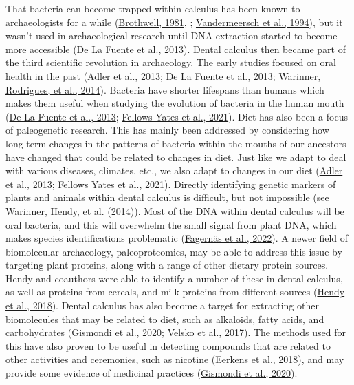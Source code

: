 \documentclass[
  b5paper,
]{book}
\begin{document}
That bacteria can become trapped within calculus has been known to
archaeologists for a while
(\protect\hyperlink{ref-brothwellDiggingBones1981}{Brothwell, 1981}, ;
\protect\hyperlink{ref-vandermeerschMiddlePaleolithic1994}{Vandermeersch
et al., 1994}), but it wasn't used in archaeological research until DNA
extraction started to become more accessible
(\protect\hyperlink{ref-delafuenteDNAHuman2013}{De La Fuente et al.,
2013}). Dental calculus then became part of the third scientific
revolution in archaeology. The early studies focused on oral health in
the past (\protect\hyperlink{ref-adlerSequencingAncient2013}{Adler et
al., 2013}; \protect\hyperlink{ref-delafuenteDNAHuman2013}{De La Fuente
et al., 2013};
\protect\hyperlink{ref-warinnerPathogensHost2014}{Warinner, Rodrigues,
et al., 2014}). Bacteria have shorter lifespans than humans which makes
them useful when studying the evolution of bacteria in the human mouth
(\protect\hyperlink{ref-delafuenteDNAHuman2013}{De La Fuente et al.,
2013}; \protect\hyperlink{ref-yatesOralMicrobiome2021}{Fellows Yates et
al., 2021}). Diet has also been a focus of paleogenetic research. This
has mainly been addressed by considering how long-term changes in the
patterns of bacteria within the mouths of our ancestors have changed
that could be related to changes in diet. Just like we adapt to deal
with various diseases, climates, etc., we also adapt to changes in our
diet (\protect\hyperlink{ref-adlerSequencingAncient2013}{Adler et al.,
2013}; \protect\hyperlink{ref-yatesOralMicrobiome2021}{Fellows Yates et
al., 2021}). Directly identifying genetic markers of plants and animals
within dental calculus is difficult, but not impossible (see Warinner,
Hendy, et al. (\protect\hyperlink{ref-warinnerEvidenceMilk2014}{2014})).
Most of the DNA within dental calculus will be oral bacteria, and this
will overwhelm the small signal from plant DNA, which makes species
identifications problematic
(\protect\hyperlink{ref-fagernasMicrobialBiogeography2022}{Fagernäs et
al., 2022}). A newer field of biomolecular archaeology, paleoproteomics,
may be able to address this issue by targeting plant proteins, along
with a range of other dietary protein sources. Hendy and coauthors were
able to identify a number of these in dental calculus, as well as
proteins from cereals, and milk proteins from different sources
(\protect\hyperlink{ref-hendyProteomicCalculus2018}{Hendy et al.,
2018}). Dental calculus has also become a target for extracting other
biomolecules that may be related to diet, such as alkaloids, fatty
acids, and carbohydrates
(\protect\hyperlink{ref-gismondiMultidisciplinaryApproach2020}{Gismondi
et al., 2020}; \protect\hyperlink{ref-velskoDentalCalculus2017}{Velsko
et al., 2017}). The methods used for this have also proven to be useful
in detecting compounds that are related to other activities and
ceremonies, such as nicotine
(\protect\hyperlink{ref-eerkensDentalCalculus2018}{Eerkens et al.,
2018}), and may provide some evidence of medicinal practices
(\protect\hyperlink{ref-gismondiMultidisciplinaryApproach2020}{Gismondi
et al., 2020}).
\end{document}
